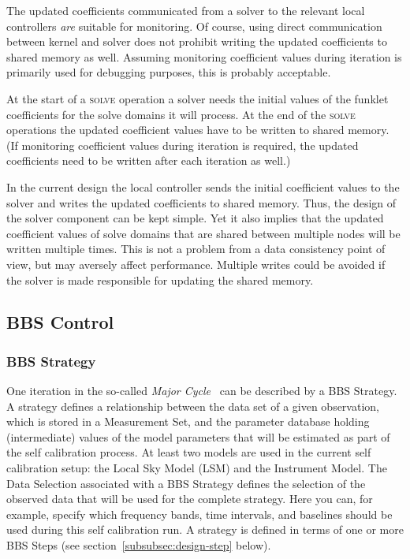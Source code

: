 \documentclass[10pt]{lofar}
\newcommand{\solve}{\textsc{solve}\xspace}
\begin{document}
The updated coefficients communicated from a solver to the relevant local
controllers \emph{are} suitable for monitoring. Of course, using direct
communication between kernel and solver does not prohibit writing the updated
coefficients to shared memory as well. Assuming monitoring coefficient values
during iteration is primarily used for debugging purposes, this is probably
acceptable.

At the start of a \solve operation a solver needs the initial values of the
funklet coefficients for the solve domains it will process. At the end of the
\solve operations the updated coefficient values have to be written to shared
memory. (If monitoring coefficient values during iteration is required, the
updated coefficients need to be written after each iteration as well.)

In the current design the local controller sends the initial coefficient values
to the solver and writes the updated coefficients to shared memory. Thus, the
design of the solver component can be kept simple. Yet it also implies that the
updated coefficient values of solve domains that are shared between multiple
nodes will be written multiple times. This is not a problem from a data
consistency point of view, but may aversely affect performance. Multiple writes
could be avoided if the solver is made responsible for updating the shared
memory.

\subsection{BBS Control}
\label{subsec:design-control}

\subsubsection{BBS Strategy}
\label{subsubsec:design-strategy}
One iteration in the so-called \emph{Major 
Cycle}~\cite[sec.~4.1]{LOFAR-ASTRON-SDD-050} can be described by a BBS
Strategy. A strategy defines a relationship between the data set of a given
observation, which is stored in a Measurement Set, and the parameter database
holding (intermediate) values of the model parameters that will be estimated
as part of the self calibration process. At least two models are used in the
current self calibration setup: the Local Sky Model (LSM) and the Instrument
Model. The Data Selection associated with a BBS Strategy defines the selection
of the observed data that will be used for the complete strategy. Here you
can, for example, specify which frequency bands, time intervals, and baselines
should be used during this self calibration run. A strategy is defined in
terms of one or more BBS Steps (see section~\ref{subsubsec:design-step}
below).
\end{document}
